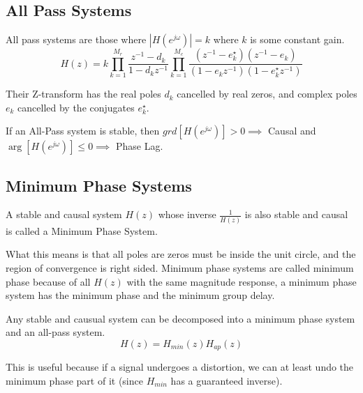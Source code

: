 \subsection{All Pass Systems}
\begin{definition}
  All pass systems are those where $|H(e^{j\omega})| = k$ where $k$ is some constant gain.
  \[
	H(z) = k\prod_{k=1}^{M_r}\frac{z^{-1}-d_k}{1-d_kz^{-1}}\prod_{k=1}^{M_c}\frac{(z^{-1}-e_k^\star)(z^{-1}-e_k)}{(1-e_kz^{-1})(1-e_k^\star z^{-1})}
  \]
  \label{defn:all-pass}
\end{definition}
Their Z-transform has the real poles $d_k$ cancelled by real zeros, and complex poles $e_k$ cancelled by the conjugates $e_k^\star$.
\begin{theorem}
  If an All-Pass system is stable, then $grd[H(e^{j\omega})] > 0 \implies $ Causal and $\arg[H(e^{j\omega})] \le 0 \implies $ Phase Lag.
  \label{thm:all-pass-properties}
\end{theorem}
\subsection{Minimum Phase Systems}
\begin{definition}
  A stable and causal system $H(z)$ whose inverse $\frac{1}{H(z)}$ is also stable and causal is called a Minimum Phase System.
  \label{defn:min-phase}
\end{definition}
What this means is that all poles are zeros must be inside the unit circle, and the region of convergence is right sided. Minimum phase systems are called minimum phase because
of all $H(z)$ with the same magnitude response, a minimum phase system has the minimum phase and the minimum group delay.
\begin{theorem}
  Any stable and causual system can be decomposed into a minimum phase system and an all-pass system.
  $$H(z) = H_{min}(z)H_{ap}(z)$$
\end{theorem}
This is useful because if a signal undergoes a distortion, we can at least undo the minimum phase part of it (since $H_{min}$ has a guaranteed inverse).

